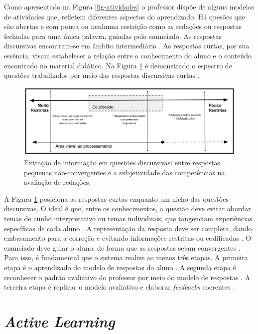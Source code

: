 Como apresentado na Figura \ref{fig-atividades} o professor dispõe de alguns modelos de atividades que, refletem diferentes aspectos do aprendizado. Há quesões que são abertas e com pouca ou nenhuma restrição como as redações \cite{almeida-junior2017} ou respostas fechadas para uma única palavra, guiadas pelo enunciado. As respostas discursivas encontram-se em âmbito intermediário \cite{bailey2008}. As respostas curtas, por sua essência, visam estabelecer a relação entre o conhecimento do aluno e o conteúdo encontrado no material didático. Na Figura \ref{fig-SAG-concepts} é demonstrado o espectro de questões trabalhados por meio das respostas discursivas curtas \cite{spalenza2017}.

\begin{figure}[!h]
\centering
\includegraphics[width=\textwidth]{figuras/aprendizadoSAG}
\caption{Extração de informação em questões discursivas: entre respostas pequenas não-convergentes e a subjetividade das competências na avaliação de redações.}
\label{fig-SAG-concepts}
\end{figure}

A Figura \ref{fig-SAG-concepts} posiciona as respostas curtas enquanto um nicho das questões discursivas. O ideal é que, entre os conhecimentos, a questão deve evitar abordar temas de cunho interpretativo ou temas individuais, que tangenciam experiências específicas de cada aluno \cite{siddiqi2008}. A representação da resposta deve ser completa, dando embasamento para a correção e evitando informações restritas ou codificadas \cite{ding2020}. O enunciado deve guiar o aluno, de forma que as respostas sejam convergentes \cite{suzen2020, filighera2020}. Para isso, é fundamental que o sistema realize ao menos três etapas. A primeira etapa é o aprendizado do modelo de respostas do aluno \cite{ramachandran2015b}. A segunda etapa é reconhecer o padrão avaliativo do professor por meio do modelo de respostas \cite{funayama2020}. A terceira etapa é replicar o modelo avaliativo e elaborar \textit{feedbacks} coerentes \cite{fowler2021}.


\section{\textit{Active Learning}}

